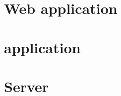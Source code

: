%

\section{Web application}

\FloatBarrier


\section{ application}

\FloatBarrier

\section{Server}



%

%
